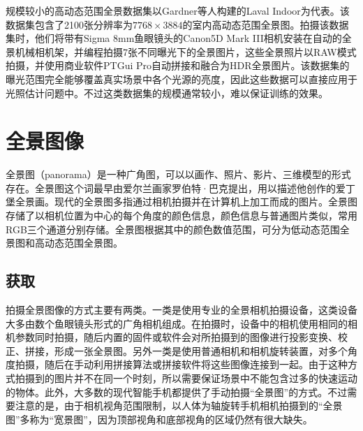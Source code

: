 规模较小的高动态范围全景数据集以Gardner等人构建的Laval Indoor\cite{gardner2017learning}为代表。该数据集包含了2100张分辨率为$7768\times3884$的室内高动态范围全景图。拍摄该数据集时，他们将带有Sigma 8mm鱼眼镜头的Canon5D Mark III相机安装在自动的全景机械相机架，并编程拍摄7张不同曝光下的全景图片，这些全景照片以RAW模式拍摄，并使用商业软件PTGui Pro\cite{ptgui}自动拼接和融合为HDR全景图片。该数据集的曝光范围完全能够覆盖真实场景中各个光源的亮度，因此这些数据可以直接应用于光照估计问题中。不过这类数据集的规模通常较小，难以保证训练的效果。

\section{全景图像}
全景图（panorama）是一种广角图，可以以画作、照片、影片、三维模型的形式存在。全景图这个词最早由爱尔兰画家罗伯特·巴克提出，用以描述他创作的爱丁堡全景画。现代的全景图多指通过相机拍摄并在计算机上加工而成的图片\cite{wikipedia}。全景图存储了以相机位置为中心的每个角度的颜色信息，颜色信息与普通图片类似，常用RGB三个通道分别存储。全景图根据其中的颜色数值范围，可分为低动态范围全景图和高动态范围全景图。

\subsection{获取}
拍摄全景图像的方式主要有两类。一类是使用专业的全景相机拍摄设备，这类设备大多由数个鱼眼镜头形式的广角相机组成。在拍摄时，设备中的相机使用相同的相机参数同时拍摄，随后内置的固件或软件会对所拍摄到的图像进行投影变换、校正、拼接，形成一张全景图。另外一类是使用普通相机和相机旋转装置，对多个角度拍摄，随后在手动利用拼接算法或拼接软件将这些图像连接到一起。由于这种方式拍摄到的图片并不在同一个时刻，所以需要保证场景中不能包含过多的快速运动的物体。此外，大多数的现代智能手机都提供了手动拍摄“全景图”的方式。不过需要注意的是，由于相机视角范围限制，以人体为轴旋转手机相机拍摄到的“全景图”多称为“宽景图”，因为顶部视角和底部视角的区域仍然有很大缺失。

